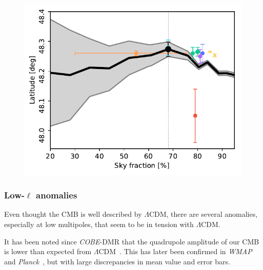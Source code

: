 \documentclass[twocolumn]{../../common/aa}
\def\COBE{\emph{COBE}}
\def\wmap{\emph{WMAP}}
\def\planck{\emph{Planck}}
\def\LCDM{$\Lambda$CDM}
\begin{document}
\begin{figure}
	\includegraphics[width=\columnwidth]{figures/dip_latitude.pdf}
\end{figure}

\subsubsection{Low-$\ell$ anomalies}
\label{sec:anomalies}

Even thought the CMB is well described by \LCDM, there are several anomalies, especially at low multipoles, that seem to be in tension with \LCDM.

It has been noted since \COBE-DMR that the quadrupole amplitude of our CMB is lower than expected from \LCDM\ \citep{bennett:1992}. This has later been confirmed in \wmap\ \citep{hinshaw2003a} and \planck\ \citep{planck2013-XV}, but with large discrepancies in mean value and error bars. 
\end{document}
